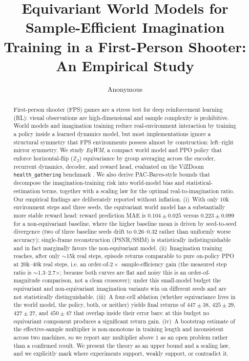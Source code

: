 \documentclass[sigconf,anonymous]{acmart}
\begin{document}
\title{Equivariant World Models for Sample-Efficient Imagination\\
Training in a First-Person Shooter: An Empirical Study}

\author{Anonymous}

\begin{abstract}
First-person shooter (FPS) games are a stress test for deep reinforcement
learning (RL): visual observations are high-dimensional and sample
complexity is prohibitive. World models and imagination training
\cite{worldmodels2018,dreamerv3} reduce real-environment interaction by
training a policy inside a learned dynamics model, but most implementations
ignore a structural symmetry that FPS environments possess almost by
construction: left--right mirror symmetry. We study \emph{EqWM}, a compact
world model and PPO policy that enforce horizontal-flip ($\mathbb Z_2$)
equivariance by group averaging across the encoder, recurrent dynamics,
decoder, and reward head, evaluated on the ViZDoom \texttt{health\_gathering}
benchmark \cite{vizdoom2016}. We also derive PAC-Bayes-style bounds that
decompose the imagination-training risk into world-model bias and
statistical-estimation terms, together with a scaling law for the optimal
real-to-imagination ratio. Our empirical findings are deliberately reported
without inflation. (i)~With only $10$k environment steps and three seeds, the
equivariant world model has a substantially more stable reward head: reward
prediction MAE is $0.104\pm0.025$ versus $0.223\pm0.099$ for a
non-equivariant baseline, where the higher baseline mean is driven by
seed-to-seed divergence (two of three baseline seeds drift to
$0.26$--$0.32$ rather than uniformly worse accuracy); single-frame
reconstruction (PSNR/SSIM) is statistically indistinguishable and in fact
marginally favors the non-equivariant model. (ii)~Imagination training
reaches, after only $\sim$15k real steps, episode returns comparable to pure
on-policy PPO at $20$k--$40$k real steps, i.e. an order-of-$2\times$
sample-efficiency gain (the measured step ratio is $\sim$1.3--2.7$\times$;
because both curves are flat and noisy this is an order-of-magnitude
comparison, not a clean crossover); under this small-model budget the
equivariant and non-equivariant imagination variants win on different seeds
and are not statistically distinguishable. (iii)~A four-cell ablation
(whether equivariance lives in the world model, the policy, both, or
neither) yields final returns of $447\pm38$, $425\pm29$, $427\pm27$, and
$450\pm47$ that overlap inside their error bars: at this budget no
equivariant component produces a significant return gain. (iv)~A bootstrap
estimate of the effective-sample multiplier is non-monotone in training
length and inconsistent across two machines, so we report any multiplier
above $1$ as an open problem rather than a confirmed result. We
present the theory as an upper bound and a scaling law, and we explicitly
mark where experiments support, weakly support, or contradict it.
\end{abstract}
\end{document}
